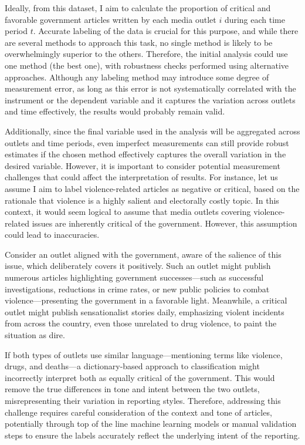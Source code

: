 Ideally, from this dataset, I aim to calculate the proportion of critical and favorable government articles written by each media outlet $i$ during each time period $t$. Accurate labeling of the data is crucial for this purpose, and while there are several methods to approach this task, no single method is likely to be overwhelmingly superior to the others. Therefore, the initial analysis could use one method (the best one), with robustness checks performed using alternative approaches. Although any labeling method may introduce some degree of measurement error, as long as this error is not systematically correlated with the instrument or the dependent variable and it captures the variation across outlets and time effectively, the results would probably remain valid. 

Additionally, since the final variable used in the analysis will be aggregated across outlets and time periods, even imperfect measurements can still provide robust estimates if the chosen method effectively captures the overall variation in the desired variable. However, it is important to consider potential measurement challenges that could affect the interpretation of results. For instance, let us assume I aim to label violence-related articles as negative or critical, based on the rationale that violence is a highly salient and electorally costly topic. In this context, it would seem logical to assume that media outlets covering violence-related issues are inherently critical of the government. However, this assumption could lead to inaccuracies.

Consider an outlet aligned with the government, aware of the salience of this issue, which deliberately covers it positively. Such an outlet might publish numerous articles highlighting government successes—such as successful investigations, reductions in crime rates, or new public policies to combat violence—presenting the government in a favorable light. Meanwhile, a critical outlet might publish sensationalist stories daily, emphasizing violent incidents from across the country, even those unrelated to drug violence, to paint the situation as dire.

If both types of outlets use similar language—mentioning terms like violence, drugs, and deaths—a dictionary-based approach to classification might incorrectly interpret both as equally critical of the government. This would remove the true differences in tone and intent between the two outlets, misrepresenting their variation in reporting styles. Therefore, addressing this challenge requires careful consideration of the context and tone of articles, potentially through top of the line machine learning models or manual validation steps to ensure the labels accurately reflect the underlying intent of the reporting.

